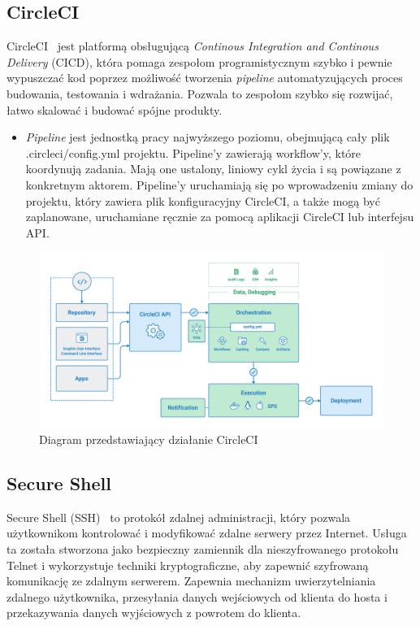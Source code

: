 	\subsection{CircleCI}
	CircleCI~\cite{circleci} jest platformą obsługującą \textit{Continous Integration and Continous Delivery} (CICD), która pomaga zespołom programistycznym szybko i pewnie wypuszczać kod poprzez możliwość tworzenia \textit{pipeline} automatyzujących proces budowania, testowania i wdrażania. Pozwala to zespołom szybko się rozwijać, łatwo skalować i budować spójne produkty.
	\begin{itemize}
	\item \textit{Pipeline} jest jednostką pracy najwyższego poziomu, obejmującą cały plik .circleci/config.yml projektu. Pipeline'y zawierają workflow'y, które koordynują zadania. Mają one ustalony, liniowy cykl życia i są powiązane z konkretnym aktorem. Pipeline'y uruchamiają się po wprowadzeniu zmiany do projektu, który zawiera plik konfiguracyjny CircleCI, a także mogą być zaplanowane, uruchamiane ręcznie za pomocą aplikacji CircleCI lub interfejsu API.
	\end{itemize}
\begin{figure}[H]
\centering\includegraphics[width=\textwidth]{figures/circleci_schema}
\caption{Diagram przedstawiający działanie CircleCI~\cite{circleci_schema}}\label{rys:CircleCI diagram}
\end{figure}

	\subsection{Secure Shell}
	Secure Shell (SSH)~\cite{ssh} to protokół zdalnej administracji, który pozwala użytkownikom kontrolować i modyfikować zdalne serwery przez Internet. Usługa ta została stworzona jako bezpieczny zamiennik dla nieszyfrowanego protokołu Telnet i wykorzystuje techniki kryptograficzne, aby zapewnić szyfrowaną komunikację ze zdalnym serwerem. Zapewnia mechanizm uwierzytelniania zdalnego użytkownika, przesyłania danych wejściowych od klienta do hosta i przekazywania danych wyjściowych z powrotem do klienta.
	
